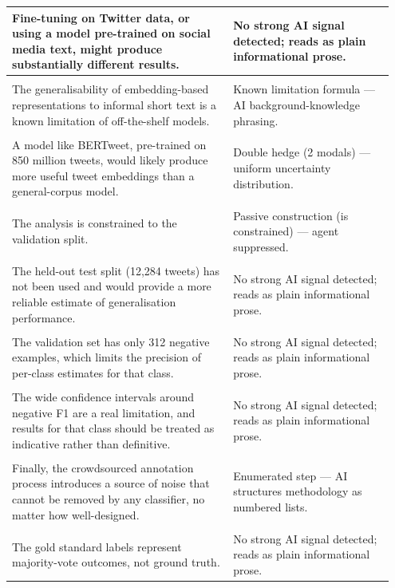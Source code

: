 \documentclass[11pt]{article}
\begin{document}
\begin{longtable}{|p{0.55\linewidth}|p{0.40\linewidth}|}
\hline
Fine-tuning on Twitter data, or using a model pre-trained on social media text, might produce substantially different results. & No strong AI signal detected; reads as plain informational prose. \\[2pt]
\hline
\rule{0pt}{3.5cm} & \\
\hline
The generalisability of embedding-based representations to informal short text is a known limitation of off-the-shelf models. & Known limitation formula --- AI background-knowledge phrasing. \\[2pt]
\hline
\rule{0pt}{3.5cm} & \\
\hline
A model like BERTweet, pre-trained on 850 million tweets, would likely produce more useful tweet embeddings than a general-corpus model. & Double hedge (2 modals) --- uniform uncertainty distribution. \\[2pt]
\hline
\rule{0pt}{3.5cm} & \\
\hline
The analysis is constrained to the validation split. & Passive construction (is constrained) --- agent suppressed. \\[2pt]
\hline
\rule{0pt}{3.5cm} & \\
\hline
The held-out test split (12,284 tweets) has not been used and would provide a more reliable estimate of generalisation performance. & No strong AI signal detected; reads as plain informational prose. \\[2pt]
\hline
\rule{0pt}{3.5cm} & \\
\hline
The validation set has only 312 negative examples, which limits the precision of per-class estimates for that class. & No strong AI signal detected; reads as plain informational prose. \\[2pt]
\hline
\rule{0pt}{3.5cm} & \\
\hline
The wide confidence intervals around negative F1 are a real limitation, and results for that class should be treated as indicative rather than definitive. & No strong AI signal detected; reads as plain informational prose. \\[2pt]
\hline
\rule{0pt}{3.5cm} & \\
\hline
Finally, the crowdsourced annotation process introduces a source of noise that cannot be removed by any classifier, no matter how well-designed. & Enumerated step --- AI structures methodology as numbered lists. \\[2pt]
\hline
\rule{0pt}{3.5cm} & \\
\hline
The gold standard labels represent majority-vote outcomes, not ground truth. & No strong AI signal detected; reads as plain informational prose. \\[2pt]

\end{longtable}
\end{document}
